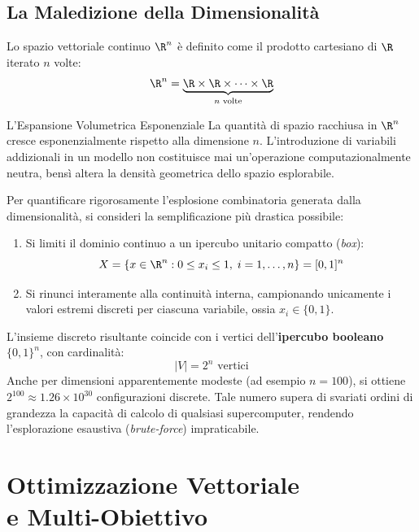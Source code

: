 \subsection{La Maledizione della Dimensionalit\`a}
Lo spazio vettoriale continuo $\R^n$ \`e definito come il prodotto cartesiano di $\R$ iterato $n$ volte:
\begin{equation}
\R^n = \underbrace{\R \times \R \times \dots \times \R}_{n \text{ volte}}
\end{equation}

\begin{noteblock}{L'Espansione Volumetrica Esponenziale}
La quantit\`a di spazio racchiusa in $\R^n$ cresce esponenzialmente rispetto alla dimensione $n$. L'introduzione di variabili addizionali in un modello non costituisce mai un'operazione computazionalmente neutra, bens\`i altera la densit\`a geometrica dello spazio esplorabile.
\end{noteblock}

Per quantificare rigorosamente l'esplosione combinatoria generata dalla dimensionalit\`a, si consideri la semplificazione pi\`u drastica possibile:
\begin{enumerate}
    \item Si limiti il dominio continuo a un ipercubo unitario compatto (\textit{box}):
    \begin{equation}
    X = \{x \in \R^n : 0 \le x_i \le 1, \; i = 1, \dots, n\} = [0, 1]^n
    \end{equation}
    \item Si rinunci interamente alla continuit\`a interna, campionando unicamente i valori estremi discreti per ciascuna variabile, ossia $x_i \in \{0, 1\}$.
\end{enumerate}

L'insieme discreto risultante coincide con i vertici dell'\textbf{ipercubo booleano} $\{0, 1\}^n$, con cardinalit\`a:
\begin{equation}
|V| = 2^n \text{ vertici}
\end{equation}
Anche per dimensioni apparentemente modeste (ad esempio $n = 100$), si ottiene $2^{100} \approx 1.26 \times 10^{30}$ configurazioni discrete. Tale numero supera di svariati ordini di grandezza la capacit\`a di calcolo di qualsiasi supercomputer, rendendo l'esplorazione esaustiva (\textit{brute-force}) impraticabile.


\FloatBarrier
\section[Ottimizzazione Vettoriale e Multi-Obiettivo]{Ottimizzazione Vettoriale\\ e Multi-Obiettivo}
\label{sec:opt-vettoriale-multiobiettivo}

